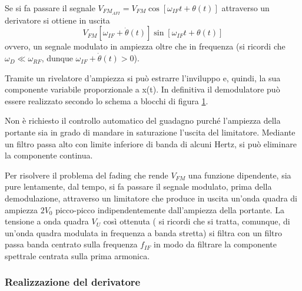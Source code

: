Se si fa passare il segnale $V_{FM_{AFI}} = V_{FM} \cos[\omega_{IF}t + \theta(t) ]$ attraverso un derivatore si ottiene in uscita
\[
V_{FM} [\omega_{IF}+\dot\theta(t)] \sin[\omega_{IF}t + \theta(t)]
\]
ovvero, un segnale modulato in ampiezza oltre che in frequenza (si ricordi che $\omega_D \ll \omega_{RF}$, dunque
$\omega_{IF} + \dot\theta(t) > 0 $).

Tramite un rivelatore d'ampiezza si può estrarre l'inviluppo e, quindi, la sua componente variabile proporzionale a x(t). In definitiva il demodulatore può essere realizzato secondo lo schema a blocchi di figura 	\ref{fig:ricevitore-fm-architettura}.

\begin{figure}[hbt]
	\centering
	\caption{}
	\label{fig:ricevitore-fm-architettura}
\end{figure}

Non è richiesto il controllo automatico del guadagno purché l'ampiezza della portante sia in grado
di mandare in saturazione l'uscita del limitatore.
Mediante un filtro passa alto con limite inferiore di banda di alcuni Hertz, si può eliminare la componente continua.


Per risolvere il problema del fading che rende $V_{FM}$ una funzione dipendente, sia pure lentamente, dal tempo, si fa passare il segnale modulato, prima della demodulazione, attraverso un limitatore che produce in uscita un'onda quadra di ampiezza $2V_0$ picco-picco indipendentemente dall'ampiezza della portante. La tensione a onda quadra $V_U$ così ottenuta ( si ricordi che si tratta, comunque, di un'onda quadra modulata in frequenza a banda stretta) si filtra con un filtro passa banda centrato sulla frequenza $f_{IF}$ in modo da filtrare la componente spettrale centrata sulla prima armonica.

\subsubsection{Realizzazione del derivatore}

\begin{figure}[hbt]
	\hspace{\fill}
	\hspace{\fill}
	\hspace{\fill}
	\caption{}
	\label{fig:ricevitore-fm-derviatore-2}
\end{figure}

